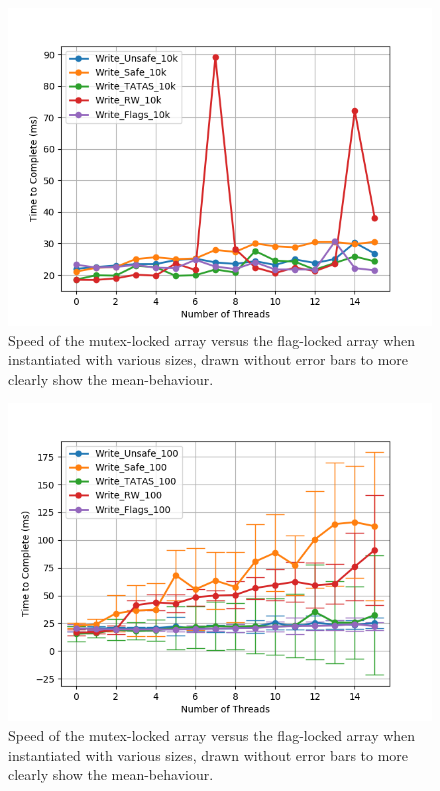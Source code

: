 \documentclass[11pt]{article}
\begin{document}
\begin{figure}\label{step7_2}
\centering
\includegraphics[scale=0.65]{step7_2.png}
\caption{Speed of the mutex-locked array versus the flag-locked array when instantiated with various sizes, drawn without error bars to more clearly show the mean-behaviour.}
\end{figure}

\begin{figure}\label{step7_3}
\centering
\includegraphics[scale=0.65]{step7_3.png}
\caption{Speed of the mutex-locked array versus the flag-locked array when instantiated with various sizes, drawn without error bars to more clearly show the mean-behaviour.}
\end{figure}
\end{document}
